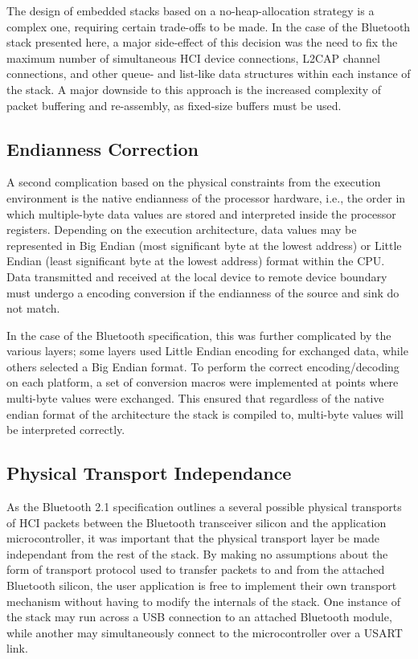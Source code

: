 The design of embedded stacks based on a no-heap-allocation strategy is a complex one, requiring certain trade-offs to be made. In the case of the Bluetooth stack presented here, a major side-effect of this decision was the need to fix the maximum number of simultaneous HCI device connections, L2CAP channel connections, and other queue- and list-like data structures within each instance of the stack. A major downside to this approach is the increased complexity of packet buffering and re-assembly, as fixed-size buffers must be used.

\FloatBarrier
\subsection{Endianness Correction}

A second complication based on the physical constraints from the execution environment is the native endianness of the processor hardware, i.e., the order in which multiple-byte data values are stored and interpreted inside the processor registers. Depending on the execution architecture, data values may be represented in Big Endian (most significant byte at the lowest address) or Little Endian (least significant byte at the lowest address) format within the CPU. Data transmitted and received at the local device to remote device boundary must undergo a encoding conversion if the endianness of the source and sink do not match.

In the case of the Bluetooth specification, this was further complicated by the various layers; some layers used Little Endian encoding for exchanged data, while others selected a Big Endian format. To perform the correct encoding/decoding on each platform, a set of conversion macros were implemented at points where multi-byte values were exchanged. This ensured that regardless of the native endian format of the architecture the stack is compiled to, multi-byte values will be interpreted correctly.

\FloatBarrier
\subsection{Physical Transport Independance}

As the Bluetooth 2.1 specification outlines a several possible physical transports of HCI packets between the Bluetooth transceiver silicon and the application microcontroller, it was important that the physical transport layer be made independant from the rest of the stack. By making no assumptions about the form of transport protocol used to transfer packets to and from the attached Bluetooth silicon, the user application is free to implement their own transport mechanism without having to modify the internals of the stack. One instance of the stack may run across a USB connection to an attached Bluetooth module, while another may simultaneously connect to the microcontroller over a USART link.

